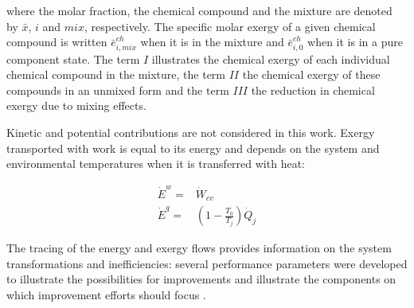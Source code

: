 \documentclass[final,times,5p]{elsarticle}
\begin{document}
	where the molar fraction, the chemical compound and the mixture are denoted by $\bar{x}$, $i$ and $mix$, respectively. The specific molar exergy of a given chemical compound is written $\bar{e}^{ch}_{i,mix}$ when it is in the mixture and $\bar{e}^{ch}_{i,0}$ when it is in a pure component state. The term $I$ illustrates the chemical exergy of each individual chemical compound in the mixture, the term $II$ the chemical exergy of these compounds in an unmixed form and the term $III$ the reduction in chemical exergy due to mixing effects.  
	

	Kinetic and potential contributions are not considered in this work. Exergy transported with work is equal to its energy and depends on the system and environmental temperatures when it is transferred with heat:

	\begin{align} 
		\dot{E}^w=&\dot{W}_{cv}\\
		\dot{E}^q=&\left(1-\frac{T_0}{T_j}\right)\dot{Q}_{j}
	\end{align}


	The tracing of the energy and exergy flows provides information on the system transformations and inefficiencies: several performance parameters were developed to illustrate the possibilities for improvements and illustrate the components on which improvement efforts should focus \cite{BejanAdrian;TsatsaronisGeorge;Moran1996,Kotas1980,Kotas1980a,Kotas1995}. 
\end{document}

